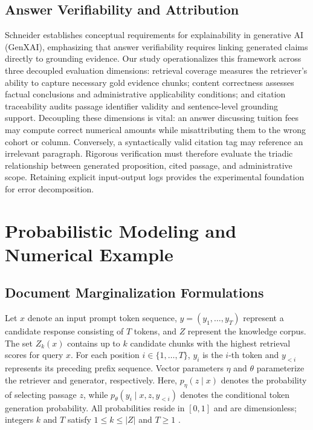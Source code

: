 \documentclass[12pt,a4paper]{article}
\begin{document}
\subsection{Answer Verifiability and Attribution}

Schneider \cite{ref2} establishes conceptual requirements for explainability in generative AI (GenXAI), emphasizing that answer verifiability requires linking generated claims directly to grounding evidence. Our study operationalizes this framework across three decoupled evaluation dimensions: retrieval coverage measures the retriever's ability to capture necessary gold evidence chunks; content correctness assesses factual conclusions and administrative applicability conditions; and citation traceability audits passage identifier validity and sentence-level grounding support. Decoupling these dimensions is vital: an answer discussing tuition fees may compute correct numerical amounts while misattributing them to the wrong cohort or column. Conversely, a syntactically valid citation tag may reference an irrelevant paragraph. Rigorous verification must therefore evaluate the triadic relationship between generated proposition, cited passage, and administrative scope. Retaining explicit input-output logs provides the experimental foundation for error decomposition.

\section{Probabilistic Modeling and Numerical Example}

\subsection{Document Marginalization Formulations}

Let $x$ denote an input prompt token sequence, $y = (y_1, \dots, y_T)$ represent a candidate response consisting of $T$ tokens, and $Z$ represent the knowledge corpus. The set $Z_k(x)$ contains up to $k$ candidate chunks with the highest retrieval scores for query $x$. For each position $i \in \{1, \dots, T\}$, $y_i$ is the $i$-th token and $y_{<i}$ represents its preceding prefix sequence. Vector parameters $\eta$ and $\theta$ parameterize the retriever and generator, respectively. Here, $p_\eta(z \mid x)$ denotes the probability of selecting passage $z$, while $p_\theta(y_i \mid x, z, y_{<i})$ denotes the conditional token generation probability. All probabilities reside in $[0, 1]$ and are dimensionless; integers $k$ and $T$ satisfy $1 \le k \le |Z|$ and $T \ge 1$ \cite{ref1}.
\end{document}
